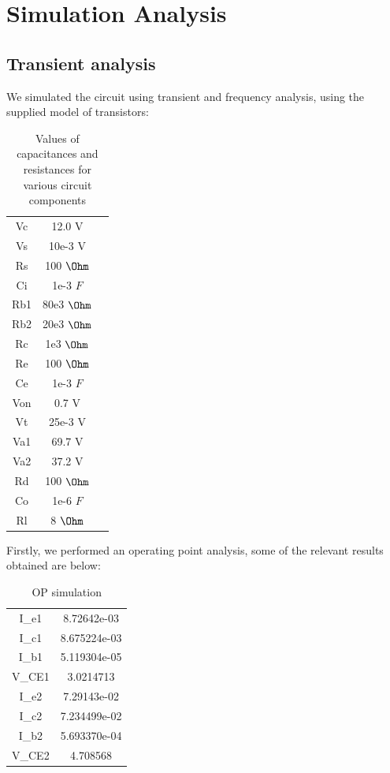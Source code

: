 \section{Simulation Analysis}
\label{sec:simulation}

\subsection{Transient analysis}

We simulated the circuit using transient and frequency analysis, using the supplied model of transistors:

\begin{table}[H]
\addtolength{\tabcolsep}{-4pt}
\caption{Values of capacitances and resistances for various circuit components}
\vspace{-3mm}
\begin{tabular}{|c|c|c|}
\hline
Vc & 12.0 V\\
Vs & 10e-3 V\\
Rs & 100 $\Ohm$\\
Ci & 1e-3 $F$\\
Rb1& 80e3 $\Ohm$\\
Rb2&20e3 $\Ohm$\\
Rc & 1e3 $\Ohm$\\
Re &100 $\Ohm$\\
Ce & 1e-3 $F$\\
Von&0.7 V\\
Vt&25e-3 V\\
Va1&69.7 V\\
Va2&37.2 V\\
Rd & 100 $\Ohm$\\
Co & 1e-6 $F$\\
Rl & 8 $\Ohm$\\

\hline
\end{tabular}
\label{tab:Components}
\end{table}

\par

Firstly, we performed an operating point analysis, some of the relevant results obtained are below:

\begin{table}[H]
    \addtolength{\tabcolsep}{-4pt}
    \caption{OP simulation}
    \vspace{-3mm}
    \begin{tabular}{|c|c|}
    \hline
    I_{e1} & 8.72642e-03\\
    I_{c1} & 8.675224e-03\\
    I_{b1} & 5.119304e-05\\  
    V_{CE1} & 3.0214713\\
    I_{e2} & 7.29143e-02\\
    I_{c2} & 7.234499e-02\\
    I_{b2} & 5.693370e-04\\  
    V_{CE2} & 4.708568\\
    \hline
    \end{tabular}
    \label{tab:OP_sim}
\end{table}

